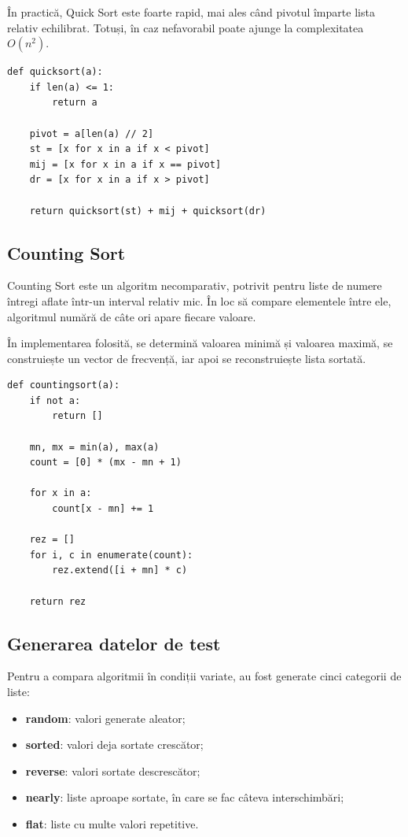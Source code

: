 \documentclass[a4paper,12pt]{article}
\begin{document}
În practică, Quick Sort este foarte rapid, mai ales când pivotul împarte lista relativ echilibrat. Totuși, în caz nefavorabil poate ajunge la complexitatea $O(n^2)$.

\begin{lstlisting}[style=mypython, caption={Implementarea Quick Sort}]
def quicksort(a):
    if len(a) <= 1:
        return a

    pivot = a[len(a) // 2]
    st = [x for x in a if x < pivot]
    mij = [x for x in a if x == pivot]
    dr = [x for x in a if x > pivot]

    return quicksort(st) + mij + quicksort(dr)
\end{lstlisting}

\subsection{Counting Sort}
Counting Sort este un algoritm necomparativ, potrivit pentru liste de numere întregi aflate într-un interval relativ mic. În loc să compare elementele între ele, algoritmul numără de câte ori apare fiecare valoare.

În implementarea folosită, se determină valoarea minimă și valoarea maximă, se construiește un vector de frecvență, iar apoi se reconstruiește lista sortată.

\begin{lstlisting}[style=mypython, caption={Implementarea Counting Sort}]
def countingsort(a):
    if not a:
        return []

    mn, mx = min(a), max(a)
    count = [0] * (mx - mn + 1)

    for x in a:
        count[x - mn] += 1

    rez = []
    for i, c in enumerate(count):
        rez.extend([i + mn] * c)

    return rez
\end{lstlisting}

\subsection{Generarea datelor de test}
Pentru a compara algoritmii în condiții variate, au fost generate cinci categorii de liste:
\begin{itemize}
    \item \textbf{random}: valori generate aleator;
    \item \textbf{sorted}: valori deja sortate crescător;
    \item \textbf{reverse}: valori sortate descrescător;
    \item \textbf{nearly}: liste aproape sortate, în care se fac câteva interschimbări;
    \item \textbf{flat}: liste cu multe valori repetitive.
\end{itemize}
\end{document}
